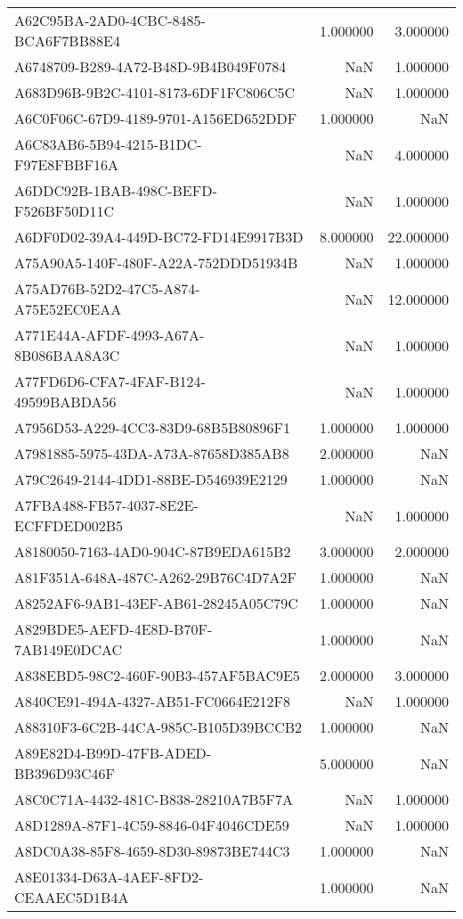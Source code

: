 \begin{tabular}{lrr}
A62C95BA-2AD0-4CBC-8485-BCA6F7BB88E4 & 1.000000 & 3.000000 \\
A6748709-B289-4A72-B48D-9B4B049F0784 & NaN & 1.000000 \\
A683D96B-9B2C-4101-8173-6DF1FC806C5C & NaN & 1.000000 \\
A6C0F06C-67D9-4189-9701-A156ED652DDF & 1.000000 & NaN \\
A6C83AB6-5B94-4215-B1DC-F97E8FBBF16A & NaN & 4.000000 \\
A6DDC92B-1BAB-498C-BEFD-F526BF50D11C & NaN & 1.000000 \\
A6DF0D02-39A4-449D-BC72-FD14E9917B3D & 8.000000 & 22.000000 \\
A75A90A5-140F-480F-A22A-752DDD51934B & NaN & 1.000000 \\
A75AD76B-52D2-47C5-A874-A75E52EC0EAA & NaN & 12.000000 \\
A771E44A-AFDF-4993-A67A-8B086BAA8A3C & NaN & 1.000000 \\
A77FD6D6-CFA7-4FAF-B124-49599BABDA56 & NaN & 1.000000 \\
A7956D53-A229-4CC3-83D9-68B5B80896F1 & 1.000000 & 1.000000 \\
A7981885-5975-43DA-A73A-87658D385AB8 & 2.000000 & NaN \\
A79C2649-2144-4DD1-88BE-D546939E2129 & 1.000000 & NaN \\
A7FBA488-FB57-4037-8E2E-ECFFDED002B5 & NaN & 1.000000 \\
A8180050-7163-4AD0-904C-87B9EDA615B2 & 3.000000 & 2.000000 \\
A81F351A-648A-487C-A262-29B76C4D7A2F & 1.000000 & NaN \\
A8252AF6-9AB1-43EF-AB61-28245A05C79C & 1.000000 & NaN \\
A829BDE5-AEFD-4E8D-B70F-7AB149E0DCAC & 1.000000 & NaN \\
A838EBD5-98C2-460F-90B3-457AF5BAC9E5 & 2.000000 & 3.000000 \\
A840CE91-494A-4327-AB51-FC0664E212F8 & NaN & 1.000000 \\
A88310F3-6C2B-44CA-985C-B105D39BCCB2 & 1.000000 & NaN \\
A89E82D4-B99D-47FB-ADED-BB396D93C46F & 5.000000 & NaN \\
A8C0C71A-4432-481C-B838-28210A7B5F7A & NaN & 1.000000 \\
A8D1289A-87F1-4C59-8846-04F4046CDE59 & NaN & 1.000000 \\
A8DC0A38-85F8-4659-8D30-89873BE744C3 & 1.000000 & NaN \\
A8E01334-D63A-4AEF-8FD2-CEAAEC5D1B4A & 1.000000 & NaN \\

\end{tabular}
